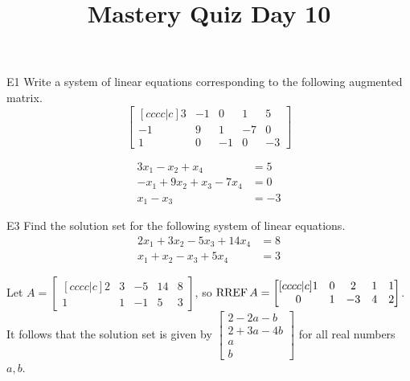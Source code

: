 \documentclass{sbgLAquiz}
\title{Mastery Quiz Day 10 }
\begin{document}
\begin{problem}{E1}
Write a system of linear equations corresponding to the following
augmented matrix.
\[
\begin{bmatrix}[cccc|c]
3 & -1 & 0 & 1 & 5 \\
-1 & 9 & 1 & -7 & 0 \\
1 & 0 & -1 & 0 & -3
\end{bmatrix}
\]
\end{problem}
\begin{solution}
\begin{align*}
3x_1-x_2+x_4 &= 5 \\
-x_1+9x_2+x_3-7x_4 &= 0 \\
x_1-x_3 &= -3
\end{align*}
\end{solution}

\begin{problem}{E3}
Find the solution set for the following system of linear equations.
\begin{align*}
2x_1+3x_2-5x_3+14x_4 &= 8 \\
x_1+x_2-x_3+5x_4&= 3
\end{align*}
\end{problem}
\begin{solution}
Let \(A =
  \begin{bmatrix}[cccc|c]
    2 & 3 & -5 & 14 & 8 \\
    1 & 1 & -1 & 5 & 3
  \end{bmatrix}
\), so \(\operatorname{RREF} A =
  \begin{bmatrix}[cccc|c]
    1 & 0 & 2 & 1 & 1 \\
    0 & 1 & -3 & 4 & 2 \\
  \end{bmatrix}
\). It follows that the solution set is given by \(
  \begin{bmatrix}
    2 - 2a - b \\
    2 + 3a - 4b \\
    a \\
    b
  \end{bmatrix}
\) for all real numbers \(a,b\).
\end{solution}
\end{document}
